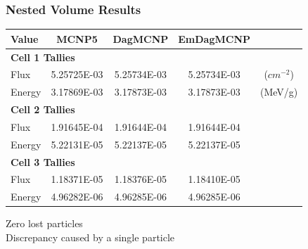 \documentclass[12pt]{beamer}
\begin{document}
\begin{frame}
\begin{center}
\begin{tikzpicture}
\end{tikzpicture}
\end{center}

\end{frame}


\begin{frame}
\frametitle{Nested Volume Results}

\begin{table}
  \small
  \begin{center}
    \label{nestedspheres}
    \begin{tabular}{lcccc}
      \toprule
      Value & MCNP5 & DagMCNP & EmDagMCNP \\
      \toprule
      \multicolumn{4}{l}{\textbf{Cell 1 Tallies}} \\
      \hline
      Flux  & 5.25725E-03 & 5.25734E-03 & 5.25734E-03 & ($cm^{-2}$) \\
      Energy  & 3.17869E-03 &  3.17873E-03 &  3.17873E-03 & (MeV/g) \\
      \hline
      \multicolumn{4}{l}{\textbf{Cell 2 Tallies}} \\
      \hline
      Flux  & 1.91645E-04 & 1.91644E-04 & 1.91644E-04 \\
      Energy  & 5.22131E-05 & 5.22137E-05 & 5.22137E-05 \\
      \hline
      \multicolumn{4}{l}{\textbf{Cell 3 Tallies}} \\
      \hline
      Flux  & 1.18371E-05 & {\color{blue} 1.18376E-05} & {\color{blue} 1.18410E-05} \\
      Energy  & 4.96282E-06 & 4.96285E-06 & 4.96285E-06 \\
      \bottomrule
                        
    \end{tabular}
    \vfill
    Zero lost particles \\
    Discrepancy caused by a single particle \\

    
  \end{center}
\end{table}

\end{frame}
\end{document}

